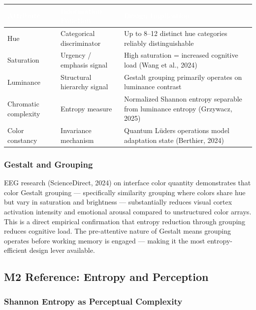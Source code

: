 \documentclass[11pt,letterpaper]{article}
\newcommand{\tableheader}[1]{\textbf{\sffamily\textcolor{white}{#1}}}
\begin{document}
\begin{center}
\begin{tabularx}{\textwidth}{L{3cm}L{4cm}X}
\toprule
{}
\tableheader{Attribute} & \tableheader{Information Function} & \tableheader{Design Implication} \\
\midrule
Hue & Categorical discriminator & Up to 8--12 distinct hue categories reliably distinguishable \\
Saturation & Urgency / emphasis signal & High saturation = increased cognitive load (Wang et al., 2024) \\
Luminance & Structural hierarchy signal & Gestalt grouping primarily operates on luminance contrast \\
Chromatic complexity & Entropy measure & Normalized Shannon entropy separable from luminance entropy (Grzywacz, 2025) \\
Color constancy & Invariance mechanism & Quantum Lüders operations model adaptation state (Berthier, 2024) \\
\bottomrule
\end{tabularx}
\end{center}

\subsubsection{Gestalt and Grouping}

EEG research (ScienceDirect, 2024) on interface color quantity demonstrates that color Gestalt grouping --- specifically similarity grouping where colors share hue but vary in saturation and brightness --- substantially reduces visual cortex activation intensity and emotional arousal compared to unstructured color arrays. This is a direct empirical confirmation that entropy reduction through grouping reduces cognitive load. The pre-attentive nature of Gestalt means grouping operates before working memory is engaged --- making it the most entropy-efficient design lever available.

\subsection{M2 Reference: Entropy and Perception}

\subsubsection{Shannon Entropy as Perceptual Complexity}
\end{document}
